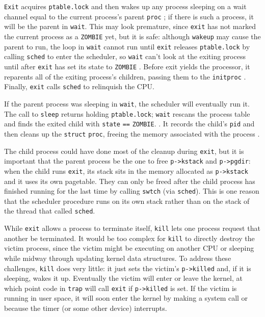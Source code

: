 \lstinline{Exit}
acquires
\lstinline{ptable.lock}
and then wakes up any process sleeping on a wait
channel equal to the current process's parent
\lstinline{proc}
;
if there is such a process, it will be the parent in
\lstinline{wait}.
This may look premature, since 
\lstinline{exit}
has not marked the current process as a
\lstinline{ZOMBIE}
yet, but it is safe:
although
\lstinline{wakeup}
may cause the parent to run,
the loop in
\lstinline{wait}
cannot run until
\lstinline{exit}
releases 
\lstinline{ptable.lock}
by calling
\lstinline{sched}
to enter the scheduler,
so
\lstinline{wait}
can't look at
the exiting process until after
\lstinline{exit}
has set its state to
\lstinline{ZOMBIE}
.
Before exit yields the processor,
it reparents all of
the exiting process's children,
passing them to the
\lstinline{initproc}
.
Finally,
\lstinline{exit}
calls
\lstinline{sched}
to relinquish the CPU.

If the parent process was sleeping in
\lstinline{wait},
the scheduler will eventually run it.
The call to
\lstinline{sleep}
returns holding
\lstinline{ptable.lock};
\lstinline{wait}
rescans the process table
and finds the exited child with
\lstinline{state}
\lstinline{==}
\lstinline{ZOMBIE}.
.
It records the child's
\lstinline{pid}
and then cleans up the 
\lstinline{struct} 
\lstinline{proc},
freeing the memory associated
with the process
.

The child process could have done most
of the cleanup during
\lstinline{exit},
but it is important that the parent 
process be the one to free
\lstinline{p->kstack} 
and 
\lstinline{p->pgdir}:
when the child runs
\lstinline{exit},
its stack sits in the memory allocated as
\lstinline{p->kstack} 
and it uses its own pagetable.
They can only be freed after the child process has
finished running for the last time by calling
\lstinline{swtch}
(via
\lstinline{sched}).
This is one reason that the scheduler procedure runs on its
own stack rather than on the stack of the thread
that called
\lstinline{sched}.

While
\lstinline{exit} 
allows a process to terminate itself,
\lstinline{kill}
lets one process request that another be terminated.
It would be too complex for
\lstinline{kill}
to directly destroy the victim process, since the victim
might be executing on another CPU or sleeping
while midway through updating kernel data structures.
To address these challenges, 
\lstinline{kill}
does very little: it just sets the victim's
\lstinline{p->killed}
and, if it is sleeping, wakes it up.
Eventually the victim will enter or leave the kernel,
at which point code in
\lstinline{trap}
will call
\lstinline{exit}
if
\lstinline{p->killed}
is set.
If the victim is running in user space, it will soon enter
the kernel by making a system call or because the timer (or
some other device) interrupts.

